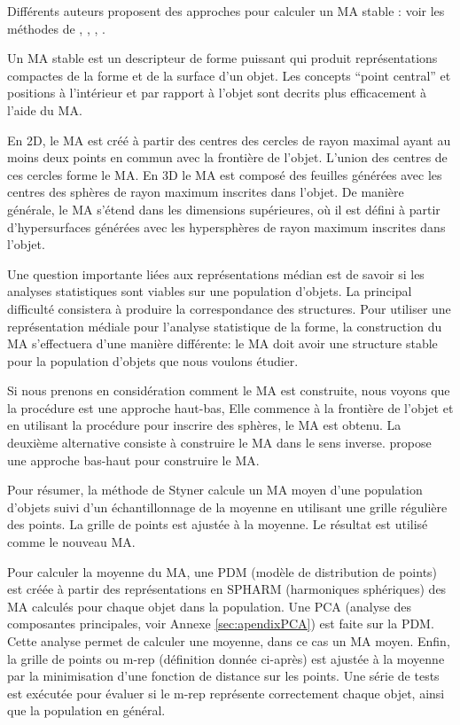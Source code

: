 Différents auteurs proposent des approches pour calculer un MA stable : voir les méthodes de
\cite{culver1999accurate}, \cite{amenta2001power}, \cite{katz2003untangling}, \cite{miklos2010discrete}.

Un MA stable est un descripteur de forme puissant qui
produit représentations compactes de la forme et de la surface d'un objet.
Les concepts ``point central'' et positions à l'intérieur et par rapport à l'objet
sont decrits plus efficacement à l'aide du MA.

En 2D, le MA est créé à partir des centres des cercles de rayon maximal ayant au moins deux
points en commun avec la frontière de l'objet. L'union des centres de ces cercles forme le MA.
En 3D le MA est composé des feuilles générées avec les centres des sphères de rayon maximum inscrites dans l'objet.
De manière générale, le MA s'étend dans les dimensions supérieures, où il est défini à partir d'hypersurfaces
générées avec les hypersphères de rayon maximum inscrites dans l'objet.

Une question importante liées aux représentations médian
est de savoir si les analyses statistiques sont viables sur une population d'objets.
La principal difficulté consistera à produire la correspondance des structures.
Pour utiliser une représentation médiale pour l'analyse statistique de la forme,
la construction du MA s'effectuera d'une manière différente:
le MA doit avoir une structure stable pour la population d'objets que nous voulons étudier.

Si nous prenons en considération comment le MA est construite, 
nous voyons que la procédure est une approche haut-bas,
Elle commence à la frontière de l'objet et en utilisant la procédure pour inscrire des sphères, le MA est obtenu.
La deuxième alternative consiste à construire le MA dans le sens inverse.
\cite{styner2001medial} propose une approche bas-haut pour construire le MA.

Pour résumer, la méthode de Styner calcule un MA moyen
d'une population d'objets suivi d'un échantillonnage de la moyenne 
en utilisant une grille régulière des points. 
La grille de points est ajustée à la moyenne. Le résultat est utilisé comme le nouveau MA.

Pour calculer la moyenne du MA, une PDM (modèle de distribution de points) 
est créée à partir des représentations en SPHARM (harmoniques sphériques)
des MA calculés pour chaque objet dans la population.
Une PCA (analyse des composantes principales, voir Annexe \ref{sec:apendixPCA})
est faite sur la PDM. Cette analyse permet de calculer une moyenne, dans ce cas un MA moyen.
Enfin, la grille de points ou m-rep (définition donnée ci-après) 
est ajustée à la moyenne par la minimisation d'une fonction de distance sur les points.
Une série de tests est exécutée pour évaluer si le m-rep 
représente correctement chaque objet, ainsi que la population en général.

